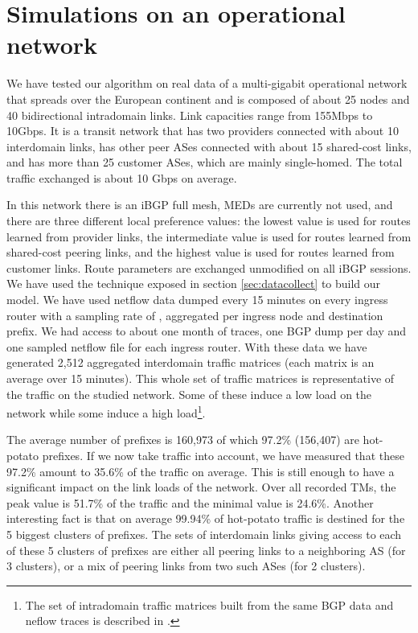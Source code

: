 \documentclass{acm_proc_article-sp}
\begin{document}
\section{Simulations on an operational network}
\label{sec:casestudy}

We have tested our algorithm on real data of a multi-gigabit operational network that spreads over the European continent and is composed of about 25 nodes and 40 bidirectional
intradomain links. Link capacities range from 155Mbps to 10Gbps. It is a transit network  
that has two providers connected with about 10 interdomain
links, has other peer ASes connected with about 15 shared-cost links, and has more
than 25 customer ASes, which are mainly single-homed. The total traffic exchanged is 
about 10 Gbps on average.

In this network there is an iBGP full
mesh, MEDs are currently not used, and there are three different 
local preference values: the lowest value is used for routes learned 
from provider links, the intermediate 
value is used for routes learned from shared-cost peering links, and the highest
value is used for routes learned from customer links. Route parameters are
exchanged unmodified on all iBGP sessions. We have used the technique
exposed in section \ref{sec:datacollect} to build our model. We have
used netflow data dumped every 15 minutes on every
ingress router with a sampling rate of , aggregated per
ingress node and destination prefix.
We had access to about one month of traces, one BGP dump per
day and one sampled netflow file for each ingress router. 
With these data we have generated 2,512 aggregated interdomain
traffic matrices (each matrix is an average over 15
minutes). This whole set of traffic matrices is representative of the
traffic on the studied network. Some of these induce a low load on the
network while some induce a high load\footnote{The set of intradomain
  traffic matrices built from the same BGP data and neflow traces is described in \cite{uhlig-ccr-matrices}.}.

The average number of prefixes is 160,973 of which 97.2\% (156,407) are
hot-potato prefixes.
If we now take traffic into account, we
have measured that these 97.2\% amount to 35.6\% of the traffic on average. 
This is still enough to have a significant impact on the link
loads of the network. Over all recorded TMs, the peak value is 51.7\% of the traffic 
and the minimal value is 24.6\%.
Another interesting fact is that on average 
99.94\% of hot-potato traffic is destined for the 5 biggest clusters of prefixes. 
The sets of interdomain links giving access to each of these 5 clusters of
prefixes are either all peering links to a neighboring AS (for 3 clusters), or a mix of peering
links from two such ASes (for 2 clusters).
\end{document}
